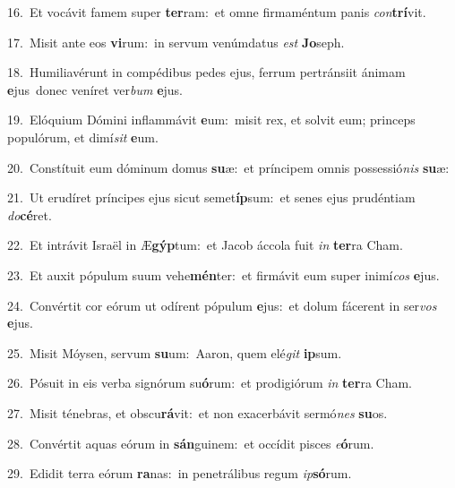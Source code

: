 {\numbfont\textcolor{\numbcolor}{16.}}~Et vocávit famem super \textbf{ter}\-ram:~\star et omne firmaméntum panis \textit{con}\-\textbf{trí}vit.\par
{\numbfont\textcolor{\numbcolor}{17.}}~Misit ante eos \textbf{vi}\-rum:~\star in servum venúmdatus \textit{est} \textbf{Jo}\-seph.\par
{\numbfont\textcolor{\numbcolor}{18.}}~Humiliavérunt in compédibus pedes ejus, ferrum pertránsiit ánimam \textbf{e}\-jus~\star donec veníret ver\textit{bum} \textbf{e}\-jus.\par
{\numbfont\textcolor{\numbcolor}{19.}}~Elóquium Dómini inflammávit \textbf{e}\-um:~\star misit rex, et solvit eum; princeps populórum, et dimí\textit{sit} \textbf{e}\-um.\par
{\numbfont\textcolor{\numbcolor}{20.}}~Constítuit eum dóminum domus \textbf{su}\-æ:~\star et príncipem omnis possessió\textit{nis} \textbf{su}\-æ:\par
{\numbfont\textcolor{\numbcolor}{21.}}~Ut erudíret príncipes ejus sicut semet\-\textbf{íp}\-sum:~\star et senes ejus prudéntiam \textit{do}\-\textbf{cé}ret.\par
{\numbfont\textcolor{\numbcolor}{22.}}~Et intrávit Israël in Æ\-\textbf{gýp}\-tum:~\star et Jacob áccola fuit \textit{in} \textbf{ter}\-ra Cham.\par
{\numbfont\textcolor{\numbcolor}{23.}}~Et auxit pópulum suum vehe\-\textbf{mén}\-ter:~\star et firmávit eum super inimí\textit{cos} \textbf{e}\-jus.\par
{\numbfont\textcolor{\numbcolor}{24.}}~Convértit cor eórum ut odírent pópulum \textbf{e}\-jus:~\star et dolum fácerent in ser\textit{vos} \textbf{e}\-jus.\par
{\numbfont\textcolor{\numbcolor}{25.}}~Misit Móysen, servum \textbf{su}\-um:~\star Aaron, quem elé\textit{git} \textbf{ip}\-sum.\par
{\numbfont\textcolor{\numbcolor}{26.}}~Pósuit in eis verba signórum su\-\textbf{ó}\-rum:~\star et prodigiórum \textit{in} \textbf{ter}\-ra Cham.\par
{\numbfont\textcolor{\numbcolor}{27.}}~Misit ténebras, et obscu\-\textbf{rá}\-vit:~\star et non exacerbávit sermó\textit{nes} \textbf{su}\-os.\par
{\numbfont\textcolor{\numbcolor}{28.}}~Convértit aquas eórum in \textbf{sán}\-guinem:~\star et occídit pisces \textit{e}\-\textbf{ó}rum.\par
{\numbfont\textcolor{\numbcolor}{29.}}~Edidit terra eórum \textbf{ra}\-nas:~\star in penetrálibus regum \textit{ip}\-\textbf{só}rum.\par
